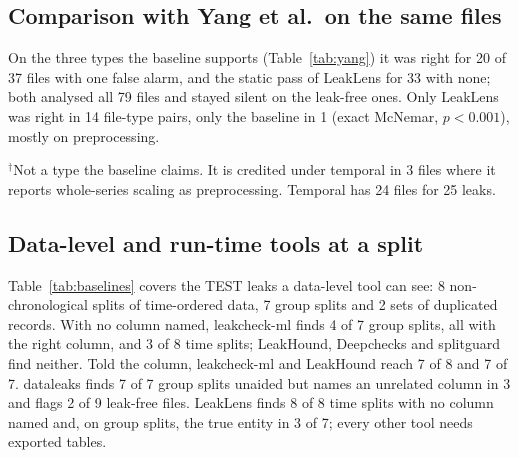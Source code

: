 \documentclass[conference]{IEEEtran}
\newcommand{\tool}{LeakLens}
\begin{document}
\subsection{Comparison with Yang et al.\ on the same files}

On the three types the baseline supports (Table~\ref{tab:yang}) it was right for 20 of 37 files with one false
alarm, and the static pass of \tool{} for 33 with none; both analysed all 79 files and stayed silent on the
leak-free ones. Only \tool{} was right in 14 file-type pairs, only the baseline in 1 (exact McNemar,
$p<0.001$), mostly on preprocessing.

\begin{table}[t]
\caption{Yang et al.\ and \tool{} (static) on the 79 injected TEST files, scored per file and type. Found: files
with the leak in which the tool reports the type. False: files where it reports the type wrongly.}
\label{tab:yang}
\footnotesize
\setlength{\tabcolsep}{4.5pt}


\vspace{2pt}
\raggedright $^{\dagger}$Not a type the baseline claims. It is credited under temporal in 3 files where it reports
whole-series scaling as preprocessing. Temporal has 24 files for 25 leaks.
\end{table}

\subsection{Data-level and run-time tools at a split}

Table~\ref{tab:baselines} covers the TEST leaks a data-level tool can see: 8 non-chronological splits of
time-ordered data, 7 group splits and 2 sets of duplicated records. With no column named, leakcheck-ml finds 4 of
7 group splits, all with the right column, and 3 of 8 time splits; LeakHound, Deepchecks and splitguard find
neither. Told the column, leakcheck-ml and LeakHound reach 7 of 8 and 7 of 7. dataleaks finds 7 of 7 group splits
unaided but names an unrelated column in 3 and flags 2 of 9 leak-free files. \tool{} finds 8 of 8 time splits with
no column named and, on group splits, the true entity in 3 of 7; every other tool needs exported tables.

\begin{table}[t]
\caption{Leaks at a split call, injected TEST. Col.: true column named to the tool. T1: non-chronological
splits; Grp: group splits (line rule), col.: naming the true entity; Dup.: duplicated records; Clean: leak-free
files flagged.}
\label{tab:baselines}
\footnotesize
\setlength{\tabcolsep}{2.6pt}

\end{table}
\end{document}

